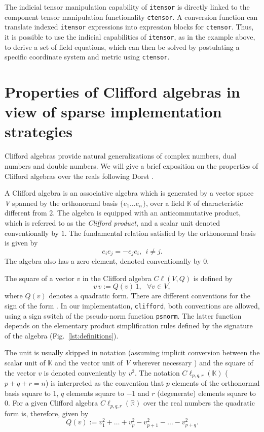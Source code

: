 \documentclass[twoside,reqno,11pt]{amsart}
\theoremstyle{definition}
\theoremstyle{remark}
\numberwithin{equation}{section}
\newcommand{\symb}[1]{{\tt #1}}
\begin{document}
The indicial tensor manipulation capability of \symb{itensor} is directly linked to the component tensor manipulation functionality \symb{ctensor}.
A conversion function can translate indexed \symb{itensor} expressions into expression blocks for \symb{ctensor}.
Thus, it is possible to use the indicial capabilities of \symb{itensor}, as in the example above, to derive a set of field equations, which can then be solved by postulating a specific coordinate system and metric using \symb{ctensor}.

\section{Properties of Clifford algebras in view of sparse implementation strategies}
\label{sec:clifprops}

Clifford algebras provide natural generalizations of complex numbers, dual numbers and double numbers.
We will give a brief exposition  on the properties of Clifford algebras over the reals following Dorst \cite{Dorst2001}.

A Clifford algebra is an associative algebra which is generated by a vector space \textit{V} spanned by the orthonormal basis $\lbrace e_1 \ldots e_n\rbrace$, over a field $\mathbb{K}$ of characteristic different from 2.
The algebra is equipped with an anticommutative product, which is referred to as the \textsl{Clifford product}, and
a scalar unit denoted conventionally by $1$. The fundamental relation satisfied by the orthonormal basis is given by
\begin{equation}
 e_i e_j = - e_j e_i, \ \ i \neq j.
\end{equation}
The algebra also has a zero element, denoted conventionally by $0$.

The square of a vector $v$ in the Clifford algebra $C\ell(V, Q)$ is defined by
\begin{equation}
v\,v := Q (v) \, 1, \ \ \ \forall v \in V,
\end{equation}
where $ Q(v)$ denotes a quadratic form.
There are different conventions for the sign of the form \cite{Porteus2000}.
In our implementation, \symb{clifford}, both conventions are allowed, using a sign switch of the pseudo-norm function
\symb{psnorm}.
The latter function depends on the elementary product simplification rules defined by the signature of the algebra (Fig.~\ref{lst:definitions}).

The unit is usually skipped in notation (assuming implicit conversion between the scalar unit of $\mathbb{K}$ and the vector unit of \textit{V} wherever necessary ) and the square of the vector $v$ is denoted conveniently by $v^2$.
The notation $C\ell_{p,q,r} (\mathbb{K})$ ($p+q+r=n$) is interpreted as the convention that
$p$ elements of the orthonormal basis square to $1$, $q$ elements square to $-1$ and $r$ (degenerate) elements square to $0$.
For a given Clifford algebra $C\ell_{p,q,r} (\mathbb{R})$ over the real numbers the quadratic form is, therefore, given by
\begin{equation}
Q(v):= v_1^2+ \ldots + v_p^{2} - v_{p+1}^{2} - \ldots - v_{p+q}^{2}.
\end{equation}
\end{document}
